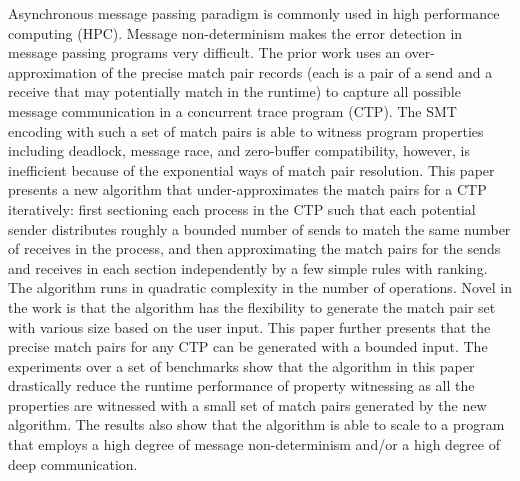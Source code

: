 Asynchronous message passing paradigm is commonly used in high performance computing (HPC).
Message non-determinism makes the error detection in message passing programs very difficult. The prior work uses an over-approximation of the precise match pair records (each is a pair of a send and a receive that may potentially match in the runtime) to capture all possible message communication in a concurrent trace program (CTP). The SMT encoding with such a set of match pairs is able to witness program properties including deadlock, message race, and zero-buffer compatibility, however, is inefficient because of the exponential ways of match pair resolution.
This paper presents a new algorithm that under-approximates the match pairs for a CTP iteratively: first sectioning each process in the CTP such that each potential sender distributes roughly a bounded number of sends to match the same number of receives in the process, and then approximating the match pairs for the sends and receives in each section independently by a few simple rules with ranking. The algorithm runs in quadratic complexity in the number of operations. Novel in the work is that the algorithm has the flexibility to generate the match pair set with various size based on the user input. This paper further presents that the precise match pairs for any CTP can be generated with a bounded input. The experiments over a set of benchmarks show that the algorithm in this paper drastically reduce the runtime performance of property witnessing as all the properties are witnessed with a small set of match pairs generated by the new algorithm. The results also show that the algorithm is able to scale to a program that employs a high degree of message non-determinism and/or a high degree of deep communication.